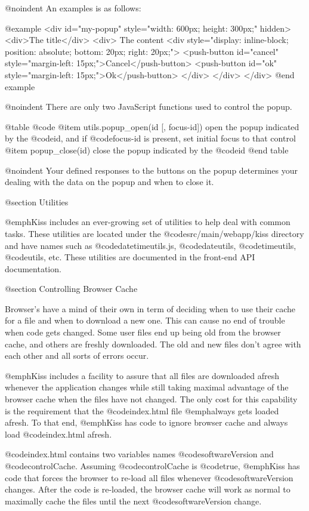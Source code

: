 @noindent
An examples is as follows:

@example
<div id="my-popup" style="width: 600px; height: 300px;" hidden>
    <div>The title</div>
    <div>
        The content
        <div style="display: inline-block; position: absolute; bottom: 20px; right: 20px;">
            <push-button id="cancel" style="margin-left: 15px;">Cancel</push-button>
            <push-button id="ok" style="margin-left: 15px;">Ok</push-button>
        </div>
    </div>
</div>
@end example

@noindent
There are only two JavaScript functions used to control the popup.

@table @code
@item utils.popup_open(id [, focus-id])
open the popup indicated by the @code{id}, and if @code{focus-id} is present, set initial focus to that control
@item popup_close(id)
close the popup indicated by the @code{id}
@end table

@noindent
Your defined responses to the buttons on the popup determines your dealing with the
data on the popup and when to close it.


@section Utilities

@emph{Kiss} includes an ever-growing set of utilities to help deal with common tasks.
These utilities are located under the @code{src/main/webapp/kiss} directory and have names such as
@code{datetimeutils.js}, @code{dateutils}, @code{timeutils}, @code{utils}, etc.  These utilities
are documented in the front-end API documentation.

@section Controlling Browser Cache

Browser's have a mind of their own in term of deciding when to use
their cache for a file and when to download a new one.  This can cause
no end of trouble when code gets changed.  Some user files end up
being old from the browser cache, and others are freshly downloaded.
The old and new files don't agree with each other and all sorts of
errors occur.

@emph{Kiss} includes a facility to assure that all files are
downloaded afresh whenever the application changes while still taking
maximal advantage of the browser cache when the files have not
changed.  The only cost for this capability is the requirement
that the @code{index.html} file @emph{always} gets loaded afresh.
To that end, @emph{Kiss} has code to ignore browser cache and always load
@code{index.html} afresh.

@code{index.html} contains two variables names @code{softwareVersion} and @code{controlCache}.
Assuming @code{controlCache} is @code{true}, @emph{Kiss} has code that forces the browser
to re-load all files whenever @code{softwareVersion} changes.  After the code is re-loaded,
the browser cache will work as normal to maximally cache the files until the next
@code{softwareVersion} change.

